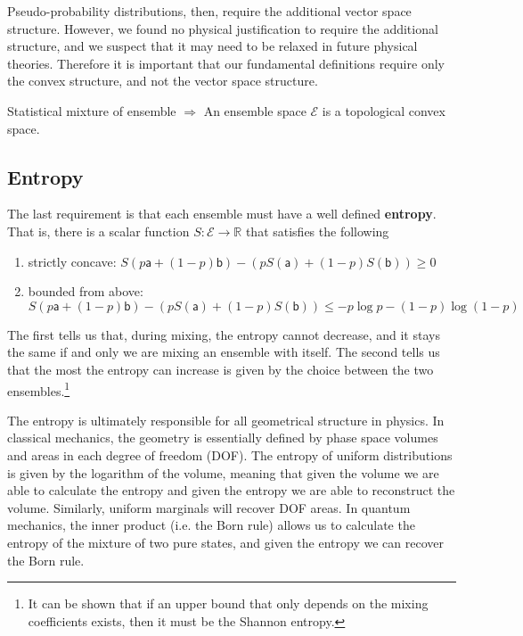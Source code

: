 \documentclass[10pt,twocolumn, nofootinbib]{revtex4-2}
\newcommand{\ens}[1][e] {\mathsf{#1}} %
\newcommand{\Ens}[1][E] {\mathcal{#1}} %
\begin{document}
Pseudo-probability distributions, then, require the additional vector space structure. However, we found no physical justification to require the additional structure, and we suspect that it may need to be relaxed in future physical theories.  Therefore it is important that our fundamental definitions require only the convex structure, and not the vector space structure.

\begin{tcolorbox}[colback=white, colframe=black]
	Statistical mixture of ensemble $\Rightarrow$ An ensemble space $\Ens$ is a topological convex space.
\end{tcolorbox}

\subsection{Entropy}
The last requirement is that each ensemble must have a well defined \textbf{entropy}. That is, there is a scalar function $S : \Ens \to \mathbb{R}$ that satisfies the following
\begin{enumerate}
	\item strictly concave: $S(p \ens[a] + (1-p) \ens[b]) - (p S(\ens[a]) + (1-p) S(\ens[b]) ) \geq 0$
	\item bounded from above: $S(p \ens[a] + (1-p) \ens[b]) - (p S(\ens[a]) + (1-p) S(\ens[b]) ) \leq - p \log p - (1-p) \log(1-p)$
\end{enumerate}
The first tells us that, during mixing, the entropy cannot decrease, and it stays the same if and only we are mixing an ensemble with itself. The second tells us that the most the entropy can increase is given by the choice between the two ensembles.\footnote{It can be shown that if an upper bound that only depends on the mixing coefficients exists, then it must be the Shannon entropy.}

The entropy is ultimately responsible for all geometrical structure in physics. In classical mechanics, the geometry is essentially defined by phase space volumes and areas in each degree of freedom (DOF). The entropy of uniform distributions is given by the logarithm of the volume, meaning that given the volume we are able to calculate the entropy and given the entropy we are able to reconstruct the volume. Similarly, uniform marginals will recover DOF areas. In quantum mechanics, the inner product (i.e. the Born rule) allows us to calculate the entropy of the mixture of two pure states, and given the entropy we can recover the Born rule.
\end{document}
